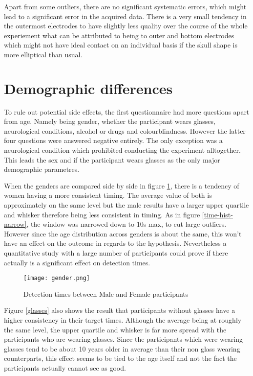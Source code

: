             Apart from some outliers, there are no significant systematic errors, which might lead to a significant error in the acquired data. There is a very small tendency in the outermost electrodes to have slightly less quality over the course of the whole experiement what can be attributed to being to outer and bottom electrodes which might not have ideal contact on an individual basis if the skull shape is more elliptical than usual.

        \section{Demographic differences}

            To rule out potential side effects, the first questionnaire had more questions apart from age. Namely being gender, whether the participant wears glasses, neurological conditions, alcohol or drugs and colourblindness. However the latter four questions were answered negative entirely. The only exception was a neurological condition which prohibited conducting the experiment alltogether. This leads the sex and if the participant wears glasses as the only major demographic parametres.
            
            When the genders are compared side by side in figure \ref*{gender}, there is a tendency of women having a more consistent timing. The average value of both is approximately on the same level but the male results have a larger upper quartile and whisker therefore being less consistent in timing. As in figure \ref*{time-hist-narrow}, the window was narrowed down to 10s max, to cut large outliers. However since the age distribution across genders is about the same, this won't have an effect on the outcome in regards to the hypothesis. Nevertheless a quantitative study with a large number of participants could prove if there actually is a significant effect on detection times.

            \begin{figure}[h]     %
                \centering
                \texttt{[image: gender.png]} 
                \caption{Detection times between Male and Female participants}\label{gender}
            \end{figure} 

            Figure \ref*{glasses} also shows the result that participants without glasses have a higher consistency in their target times. Although the average being at roughly the same level, the upper quartile and whisker is far more spread with the participants who are wearing glasses. Since the participants which were wearing glasses tend to be about 10 years older in average than their non glass wearing counterparts, this effect seems to be tied to the age itself and not the fact the participants actually cannot see as good.

